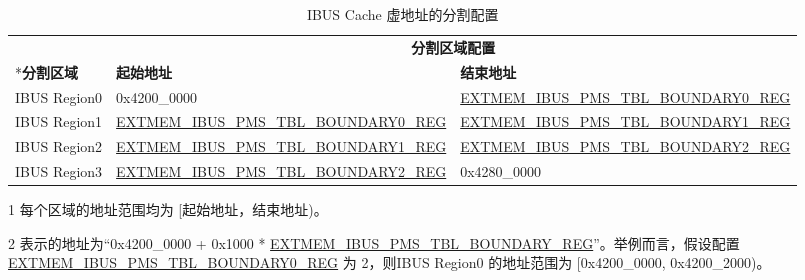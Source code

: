 \documentclass[main\_\_CN.tex]{subfiles}
\begin{document}
\begin{table}[H]
    \centering
    \caption{IBUS Cache 虚地址的分割配置}
    \label{tab:ibus_acs_cache_region_config}
    \begin{threeparttable}
    \begin{tabular}{ | l | l | l |}
    \hline
        \rowcolor{lightgray}
         & \multicolumn{2}{c|}{\textbf{分割区域配置}} \\\cline{2-3}
        \rowcolor{lightgray}
        \multirow{-2}*{\textbf{分割区域}\tnote{1}} & \textbf{起始地址} & \textbf{结束地址}\\\hline
        IBUS Region0  & 0x4200\_0000                                                                          & \hyperref[regdesc:EXTMEMIBUSPMSTBLBOUNDARY0REG]{EXTMEM\_IBUS\_PMS\_TBL\_BOUNDARY0\_REG}\tnote{2} \\\hline
        IBUS Region1  & \hyperref[regdesc:EXTMEMIBUSPMSTBLBOUNDARY0REG]{EXTMEM\_IBUS\_PMS\_TBL\_BOUNDARY0\_REG}\tnote{2} & \hyperref[regdesc:EXTMEMIBUSPMSTBLBOUNDARY1REG]{EXTMEM\_IBUS\_PMS\_TBL\_BOUNDARY1\_REG}\tnote{2} \\\hline
        IBUS Region2  & \hyperref[regdesc:EXTMEMIBUSPMSTBLBOUNDARY1REG]{EXTMEM\_IBUS\_PMS\_TBL\_BOUNDARY1\_REG}\tnote{2} & \hyperref[regdesc:EXTMEMIBUSPMSTBLBOUNDARY2REG]{EXTMEM\_IBUS\_PMS\_TBL\_BOUNDARY2\_REG}\tnote{2} \\\hline
        IBUS Region3  & \hyperref[regdesc:EXTMEMIBUSPMSTBLBOUNDARY2REG]{EXTMEM\_IBUS\_PMS\_TBL\_BOUNDARY2\_REG}\tnote{2} & 0x4280\_0000 \\\hline
    \end{tabular}
    \begin{tablenotes}
        \item[1] 每个区域的地址范围均为 [起始地址，结束地址)。
        \item[2] 表示的地址为“0x4200\_0000 + 0x1000 * \hyperref[regdesc:EXTMEMIBUSPMSTBLBOUNDARY1REG]{EXTMEM\_IBUS\_PMS\_TBL\_BOUNDARY\_REG}”。举例而言，假设配置 \hyperref[regdesc:EXTMEMIBUSPMSTBLBOUNDARY1REG]{EXTMEM\_IBUS\_PMS\_TBL\_BOUNDARY0\_REG} 为 2，则IBUS Region0 的地址范围为 [0x4200\_0000, 0x4200\_2000)。
        \end{tablenotes}
    \end{threeparttable}
\end{table}
\end{document}
